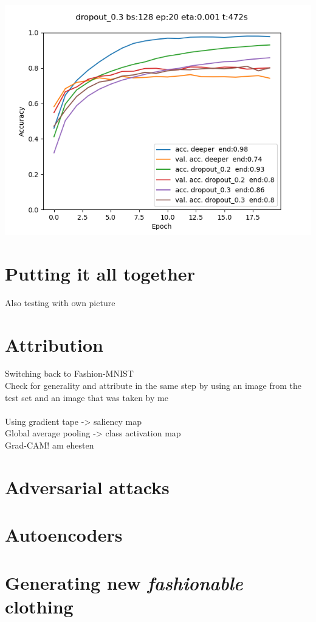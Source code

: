 \documentclass{article}
\newenvironment{Figure}
{\par\medskip\noindent\minipage{\linewidth}}
{\endminipage\par\medskip}
\begin{document}
\begin{multicols}{2}
\begin{Figure}
	\label{fig:dropout}
	\centering
	\includegraphics[width=\linewidth]{../img_1_5_regularization/dropout}
\end{Figure}

\section{Putting it all together}

Also testing with own picture

\section{Attribution}
Switching back to Fashion-MNIST\\


Check for generality and attribute in the same step by using an image from the test set and an image that was taken by me\\
\\
Using gradient tape -> saliency map\\
Global average pooling -> class activation map\\
Grad-CAM! am ehesten

\section{Adversarial attacks}

\section{Autoencoders}

\section{Generating new \textit{fashionable} clothing}

\end{multicols}
\end{document}
